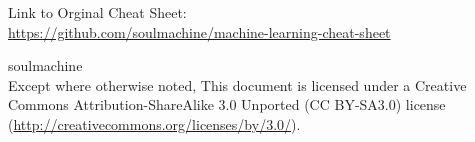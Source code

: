 \onecolumn
\begin{titlepage}

{\large Link to Orginal Cheat Sheet:}\\
\url{https://github.com/soulmachine/machine-learning-cheat-sheet}

\end{titlepage}

\newpage

\noindent {} soulmachine \\
Except where otherwise noted, This document is licensed under a Creative Commons 
Attribution-ShareAlike 3.0 Unported (CC BY-SA3.0) license \\ (\url{http://creativecommons.org/licenses/by/3.0/}).
